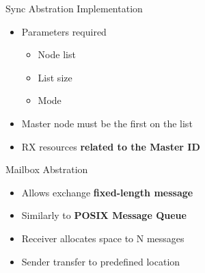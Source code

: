 		\begin{frame}[fragile]{Sync Abstration Implementation}
			\begin{itemize}
				\item Parameters required
				\begin{itemize}
					\item Node list
					\item List size
					\item Mode
				\end{itemize}
				\item Master node must be the first on the list
				\item RX resources \textbf{related to the Master ID}
			\end{itemize}


		\end{frame}

		\begin{frame}[fragile]{Mailbox Abstration}
			\begin{itemize}
				\item Allows exchange \textbf{fixed-length message}
				\item Similarly to \textbf{POSIX Message Queue}
				\item Receiver allocates space to N messages
				\item Sender transfer to predefined location
			\end{itemize}

	
		\end{frame}

